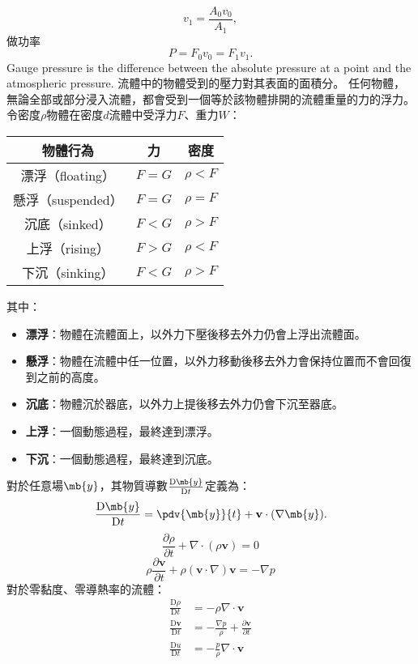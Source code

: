 \documentclass[a4paper,12pt]{article}
\begin{document}
\[v_1=\frac{A_0v_0}{A_1},\]
做功率
\[P=F_0v_0=F_1v_1.\]
Gauge pressure is the difference between the absolute pressure at a point and the atmospheric pressure.
流體中的物體受到的壓力對其表面的面積分。
任何物體，無論全部或部分浸入流體，都會受到一個等於該物體排開的流體重量的力的浮力。
令密度$\rho$物體在密度$d$流體中受浮力$F$、重力$W$：
\begin{longtable}[c]{|c|c|c|}
\hline
物體行為 & 力 & 密度 \\\hline\endhead
漂浮（floating） & $F=G$ & $\rho<F$ \\\hline
懸浮（suspended） & $F=G$ & $\rho=F$ \\\hline
沉底（sinked） & $F<G$ & $\rho>F$ \\\hline
上浮（rising） & $F>G$ & $\rho<F$ \\\hline
下沉（sinking） & $F<G$ & $\rho>F$ \\\hline
\end{longtable}\FB
其中：
\begin{itemize}
\item\textbf{漂浮}：物體在流體面上，以外力下壓後移去外力仍會上浮出流體面。
\item\textbf{懸浮}：物體在流體中任一位置，以外力移動後移去外力會保持位置而不會回復到之前的高度。
\item\textbf{沉底}：物體沉於器底，以外力上提後移去外力仍會下沉至器底。
\item\textbf{上浮}：一個動態過程，最終達到漂浮。
\item\textbf{下沉}：一個動態過程，最終達到沉底。
\end{itemize}
對於任意場$\mb{y}$，其物質導數$\frac{\mathrm{D}\mb{y}}{\mathrm{D}t}$定義為：
\[\frac{\mathrm{D}\mb{y}}{\mathrm{D}t}=\pdv{\mb{y}}{t}+\mathbf{v}\cdot(\nabla \mb{y}).\]
\[\frac{\partial\rho}{\partial t}+\nabla\cdot(\rho\mathbf{v})=0\]
\[\rho\frac{\partial\mathbf{v}}{\partial t}+\rho(\mathbf{v}\cdot\nabla)\mathbf{v}=-\nabla p\]
對於零黏度、零導熱率的流體：
\[\begin{aligned}
\frac{\mathrm{D}\rho}{\mathrm{D}t}&=-\rho\nabla\cdot\mathbf {v}\\
\frac{\mathrm{D}\mathbf{v}}{\mathrm{D}t}&=-\frac{\nabla p}{\rho}+\frac{\partial\mathbf{v}}{\partial t}\\
\frac{\mathrm{D}u}{\mathrm{D}t}&=-\frac{p}{\rho}\nabla\cdot\mathbf{v}
\end{aligned}\]
\end{document}
